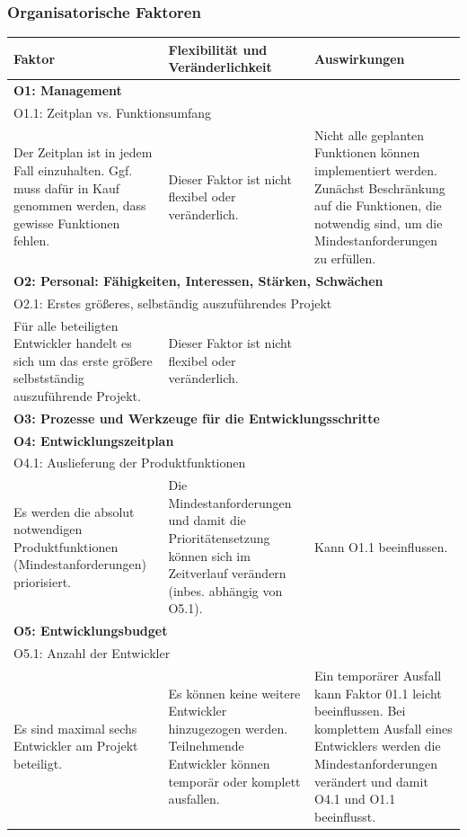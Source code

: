 \documentclass[fontsize=12pt,paper=a4,twoside]{scrartcl}
\renewcommand{\arraystretch}{1.2}
\begin{document}
\subsubsection{Organisatorische Faktoren}
\renewcommand{\arraystretch}{1.4}
\begin{tabularx}{\textwidth}{|X|X|X|}
\hline
\textbf{Faktor} & \textbf{Flexibilität und Veränderlichkeit} & \textbf{Auswirkungen}\\\hline
\hline
\multicolumn{3}{|l|}{\textbf{O1: Management}}\\\hline
\multicolumn{3}{|l|}{O1.1: Zeitplan vs. Funktionsumfang}\\\hline
Der Zeitplan ist in jedem Fall einzuhalten. Ggf. muss dafür in Kauf genommen werden, dass gewisse Funktionen fehlen. & Dieser Faktor ist nicht flexibel oder veränderlich. & Nicht alle geplanten Funktionen können implementiert werden. Zunächst Beschränkung auf die Funktionen, die notwendig sind, um die Mindestanforderungen zu erfüllen.\\\hline

\multicolumn{3}{|l|}{\textbf{O2: Personal: Fähigkeiten, Interessen, Stärken, Schwächen}}\\\hline
\multicolumn{3}{|l|}{O2.1: Erstes größeres, selbständig auszuführendes Projekt}\\\hline
Für alle beteiligten Entwickler handelt es sich um das erste größere selbstständig auszuführende Projekt. & Dieser Faktor ist nicht flexibel oder veränderlich. & %
\\\hline

\multicolumn{3}{|l|}{\textbf{O3: Prozesse und Werkzeuge für die Entwicklungsschritte}}\\\hline

\multicolumn{3}{|l|}{\textbf{O4: Entwicklungszeitplan}}\\\hline
\multicolumn{3}{|l|}{O4.1: Auslieferung der Produktfunktionen}\\\hline
Es werden die absolut notwendigen Produktfunktionen (Mindestanforderungen) priorisiert. & Die Mindestanforderungen und damit die Prioritätensetzung können sich im Zeitverlauf verändern (inbes. abhängig von O5.1). & Kann O1.1 beeinflussen.\\\hline

\multicolumn{3}{|l|}{\textbf{O5: Entwicklungsbudget}}\\\hline
\multicolumn{3}{|l|}{O5.1: Anzahl der Entwickler}\\\hline
Es sind maximal sechs Entwickler am Projekt beteiligt. & Es können keine weitere Entwickler hinzugezogen werden. Teilnehmende Entwickler können temporär oder komplett ausfallen. & Ein temporärer Ausfall kann Faktor 01.1 leicht beeinflussen. Bei komplettem Ausfall eines Entwicklers werden die Mindestanforderungen verändert und damit O4.1 und O1.1 beeinflusst.\\\hline
\end{tabularx}\\
\clearpage
\end{document}
